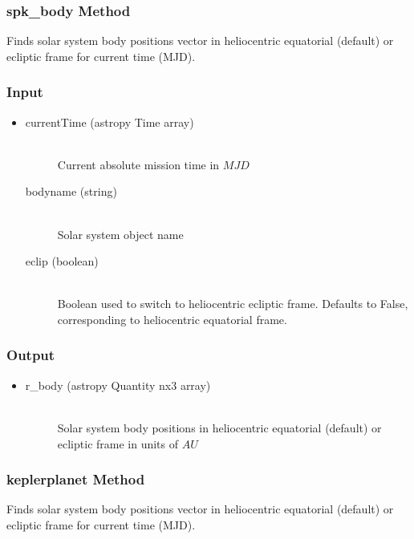 \documentclass[cleanfoot]{asme2ej}
\begin{document}
\subsubsection{spk\_body Method} \label{sec:spkbody}
Finds solar system body positions vector in heliocentric equatorial (default) or ecliptic frame for current time (MJD).
\subsubsection*{Input}
\begin{itemize}
\item
\begin{description}
    \item[currentTime (astropy Time array)] \hfill \\ Current absolute mission time in $MJD$
    \item[bodyname (string)] \hfill \\ Solar system object name
    \item[eclip (boolean)] \hfill \\Boolean used to switch to heliocentric ecliptic frame. Defaults to False, corresponding to heliocentric equatorial frame.
\end{description}
\end{itemize}
\subsubsection*{Output}
\begin{itemize}
\item
\begin{description}
    \item[r\_body (astropy Quantity nx3 array)] \hfill \\ Solar system body positions in heliocentric equatorial (default) or ecliptic frame in units of $AU$
\end{description}
\end{itemize}

\subsubsection{keplerplanet Method} \label{sec:keplerplanet}
Finds solar system body positions vector in heliocentric equatorial (default) or ecliptic frame for current time (MJD).
\end{document}
